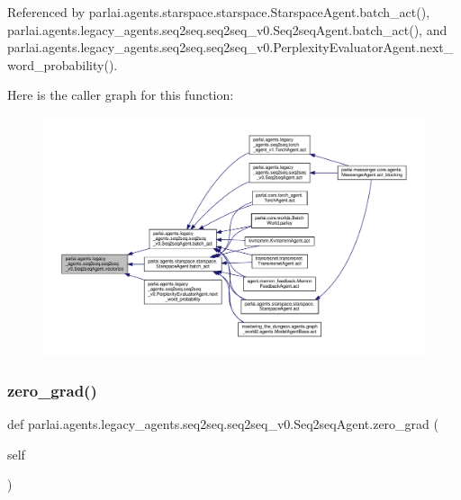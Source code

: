 Referenced by parlai.\+agents.\+starspace.\+starspace.\+Starspace\+Agent.\+batch\+\_\+act(), parlai.\+agents.\+legacy\+\_\+agents.\+seq2seq.\+seq2seq\+\_\+v0.\+Seq2seq\+Agent.\+batch\+\_\+act(), and parlai.\+agents.\+legacy\+\_\+agents.\+seq2seq.\+seq2seq\+\_\+v0.\+Perplexity\+Evaluator\+Agent.\+next\+\_\+word\+\_\+probability().

Here is the caller graph for this function\+:
\nopagebreak
\begin{figure}[H]
\begin{center}
\leavevmode
\includegraphics[width=350pt]{classparlai_1_1agents_1_1legacy__agents_1_1seq2seq_1_1seq2seq__v0_1_1Seq2seqAgent_a83e2433e00bff6162ebad3b818771b59_icgraph}
\end{center}
\end{figure}
\mbox{\label{classparlai_1_1agents_1_1legacy__agents_1_1seq2seq_1_1seq2seq__v0_1_1Seq2seqAgent_a0be9f1e378a403284d8afac5648fbf4d}} 
\subsubsection{\texorpdfstring{zero\+\_\+grad()}{zero\_grad()}}
{\footnotesize\ttfamily def parlai.\+agents.\+legacy\+\_\+agents.\+seq2seq.\+seq2seq\+\_\+v0.\+Seq2seq\+Agent.\+zero\+\_\+grad (\begin{DoxyParamCaption}\item[{}]{self }\end{DoxyParamCaption})}

